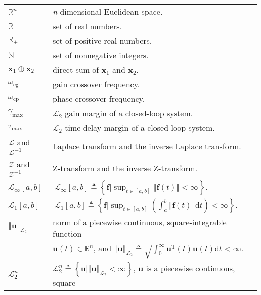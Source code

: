 \begin{table} [H]
	\begin{tabular}{ll}
		$\mathbb{R}^{n}$ & \textit{n}-dimensional Euclidean space.\\
		$\mathbb{R}$ & set of real numbers.\\
		$\mathbb{R}_{+}$ & set of positive real numbers.\\
		$\mathbb{N}$ & set of nonnegative integers.\\
		$\mathbf{x}_{1}\oplus\mathbf{x}_{2}$ & direct sum of $\mathbf{x}_{1}$ and $\mathbf{x}_{2}$.\\
		$\omega_{\text{cg}}$ & gain crossover frequency.\\
		$\omega_{\text{cp}}$  & phase crossover frequency.\\
		$\gamma_{\max}$ & $\mathcal{L}_{2}$ gain margin of a closed-loop system.\\
		$\tau_{\max}$ & $\mathcal{L}_{2}$ time-delay margin of a closed-loop system.\\
		$\mathcal{\mathcal{L}}$ and $\mathcal{\mathcal{L}}^{-1}$ & Laplace transform and the inverse Laplace transform.\\
		$\mathcal{Z}$ and $\mathcal{Z}^{-1}$  & Z-transform and
		the inverse Z-transform.\\
		$\mathcal{L}_{\infty}\left[  a,b\right]  $ & $\  \mathcal{L}_{\infty}\left[
		a,b\right]  \triangleq \left \{  \left.  \mathbf{f}\right \vert \sup_{t\in \left[
			a,b\right]  }\left \Vert \mathbf{f}\left(  t\right)  \right \Vert <\infty
		\right \}.  $\\
		$\mathcal{L}_{1}\left[  a,b\right]  $ & $\  \mathcal{L}_{1}\left[
		a,b\right]  \triangleq \left \{  \left.  \mathbf{f}\right \vert \sup_{t\in \left[
			a,b\right]  }\left(\int_{a}^{b}\left \Vert \mathbf{f}\left(  t\right)  \right \Vert\text{d}t \right) <\infty\right \}.  $\\
		$\left\Vert \mathbf{u}\right\Vert _{\mathcal{L}_{2}}$ & norm of a piecewise continuous, square-integrable function\\
		& 	$\mathbf{u}\left(t\right)\in\mathbb{R}^{n}$, and 
		$\left\Vert \mathbf{u}\right\Vert _{\mathcal{L}_{2}}\triangleq\sqrt{\int_{0}^{\infty}\mathbf{u}^{\text{T}}\left(t\right)\mathbf{u}\left(t\right)\text{d}t}<\infty$.\\
		$\mathcal{L}_{2}^{n}$ & $\mathcal{L}_{2}^{n}\triangleq\left\{ \mathbf{u}|\left\Vert \mathbf{u}\right\Vert _{\mathcal{L}_{2}}<\infty\right\}$, $\mathbf{u}$ is a piecewise continuous, square-\\

\end{tabular}
\end{table}
